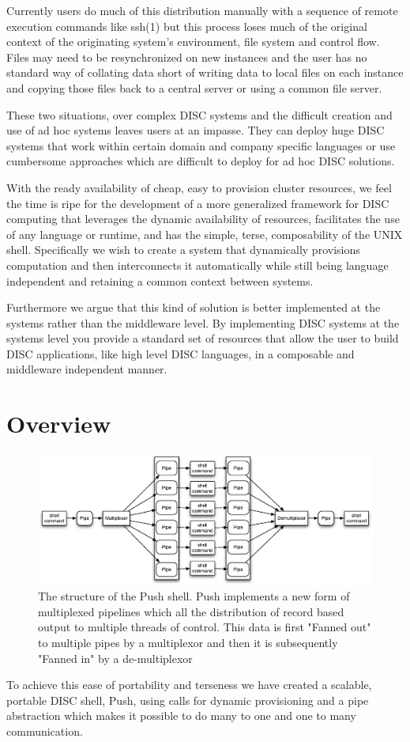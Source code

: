 \documentclass[10pt,conference,letterpaper]{IEEEtran}
\begin{document}
Currently users do much of this distribution manually with a sequence of remote execution commands like ssh(1) but this process loses much of the original context of the originating system's environment, file system and control flow. Files may need to be resynchronized on new instances and the user has no standard way of collating data short of writing data to local files on each instance and copying those files back to a central server or using a common file server.

These two situations, over complex DISC systems and the difficult creation and use of ad hoc systems leaves users at an impasse. They can deploy huge DISC systems that work within certain domain and company specific languages or use cumbersome approaches which are difficult to deploy for ad hoc DISC solutions. 

With the ready availability of cheap, easy to provision cluster resources, we feel the time is ripe for the development of a more generalized framework for DISC computing that leverages the dynamic availability of resources, facilitates the use of any language or runtime, and has the simple, terse, composability of the UNIX shell. Specifically we wish to create a system that dynamically provisions computation and then interconnects it automatically while still being language independent and retaining a common context between systems.

Furthermore we argue that this kind of solution is better implemented at the systems rather than the middleware level. By implementing DISC systems at the systems level you provide a standard set of resources that allow the user to build DISC applications, like high level DISC languages, in a composable and middleware independent manner. 

\section{Overview}
\begin{figure}[htp]
\centering
\includegraphics[width=4.5in]{pipestruct.eps}
\caption{The structure of the Push shell. Push implements a new form of multiplexed pipelines which all the distribution of record based output to multiple threads of control. This data is first "Fanned out" to multiple pipes by a multiplexor and then it is subsequently "Fanned in" by a de-multiplexor}\label{fig:pipestruct} 
\end{figure}
To achieve this ease of portability and terseness we have created a scalable, portable DISC shell, Push, using calls for dynamic provisioning and a pipe abstraction which makes it possible to do many to one and one to many communication. 
\end{document}
